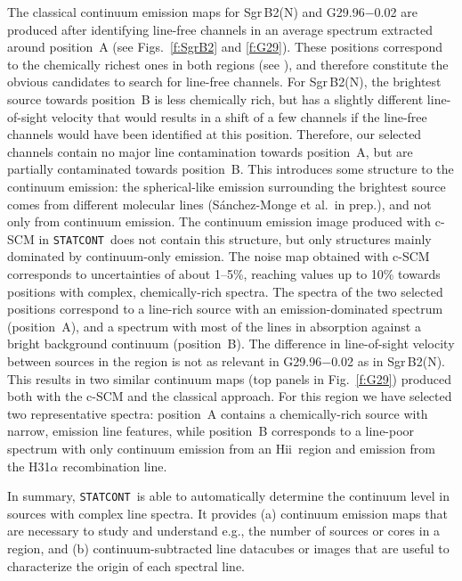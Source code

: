 \documentclass{aa}
\newcommand{\statcont} {\texttt{STATCONT}}
\newcommand{\hii} {H{\sc ii}}
\begin{document}
The classical continuum emission maps for Sgr\,B2(N) and G29.96$-$0.02 are produced after identifying line-free channels in an average spectrum extracted around position~A (see Figs.~\ref{f:SgrB2} and \ref{f:G29}). These positions correspond to the chemically richest ones in both regions (see \citealt{SanchezMonge2017, Cesaroni2017}), and therefore constitute the obvious candidates to search for line-free channels. For Sgr\,B2(N), the brightest source towards position~B is less chemically rich, but has a slightly different line-of-sight velocity that would results in a shift of a few channels if the line-free channels would have been identified at this position. Therefore, our selected channels contain no major line contamination towards position~A, but are partially contaminated towards position~B. This introduces some structure to the continuum emission: the spherical-like emission surrounding the brightest source comes from different molecular lines (S\'anchez-Monge et al.\ in prep.), and not only from continuum emission. The continuum emission image produced with c-SCM in \statcont\ does not contain this structure, but only structures mainly dominated by continuum-only emission. The noise map obtained with c-SCM corresponds to uncertainties of about 1--5\%, reaching values up to 10\% towards positions with complex, chemically-rich spectra. The spectra of the two selected positions correspond to a line-rich source with an emission-dominated spectrum (position~A), and a spectrum with most of the lines in absorption against a bright background continuum (position~B). The difference in line-of-sight velocity between sources in the region is not as relevant in G29.96$-$0.02 as in Sgr\,B2(N). This results in two similar continuum maps (top panels in Fig.~\ref{f:G29}) produced both with the c-SCM and the classical approach. For this region we have selected two representative spectra: position~A contains a chemically-rich source with narrow, emission line features, while position~B corresponds to a line-poor spectrum with only continuum emission from an \hii\ region and emission from the H31$\alpha$ recombination line.

In summary, \statcont\ is able to automatically determine the continuum level in sources with complex line spectra. It provides (a) continuum emission maps that are necessary to study and understand e.g., the number of sources or cores in a region, and (b) continuum-subtracted line datacubes or images that are useful to characterize the origin of each spectral line.
\end{document}
